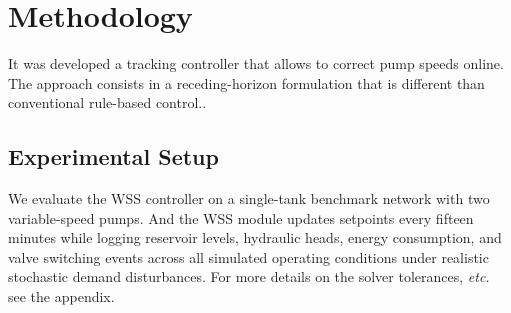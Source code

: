 \section{Methodology}
It was developed a tracking controller that allows to correct pump speeds online.
The approach consists in a receding-horizon formulation that is different than conventional rule-based control..

\subsection{Experimental Setup}
We evaluate the WSS controller on a single-tank benchmark network with two variable-speed pumps.
And the WSS module updates setpoints every fifteen minutes while logging reservoir levels, hydraulic heads, energy consumption, and valve switching events across all simulated operating conditions under realistic stochastic demand disturbances.
For more details on the solver tolerances, \textit{etc.} see the appendix.
